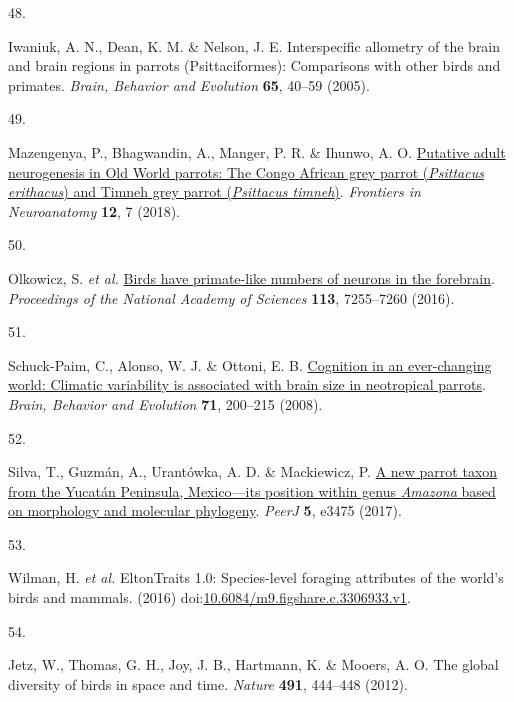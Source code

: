 \documentclass[
  man,floatsintext]{apa6}
\newlength{\cslhangindent}
\newlength{\csllabelwidth}
\newlength{\cslentryspacingunit} %
\newenvironment{CSLReferences}[2] %
 {%
  \setlength{\parindent}{0pt}
  \ifodd #1
  \let\oldpar\par
  \def\par{\hangindent=\cslhangindent\oldpar}
  \fi
  \setlength{\parskip}{#2\cslentryspacingunit}
 }%
 {}
\newcommand{\CSLLeftMargin}[1]{\parbox[t]{\csllabelwidth}{#1}}
\newcommand{\CSLRightInline}[1]{\parbox[t]{\linewidth - \csllabelwidth}{#1}\break}
\begin{document}
\begin{CSLReferences}{0}{0}
\leavevmode{}%
\CSLLeftMargin{48. }%
\CSLRightInline{Iwaniuk, A. N., Dean, K. M. \& Nelson, J. E. Interspecific allometry of the brain and brain regions in parrots ({P}sittaciformes): Comparisons with other birds and primates. \emph{Brain, Behavior and Evolution} \textbf{65}, 40--59 (2005).}

\leavevmode{}%
\CSLLeftMargin{49. }%
\CSLRightInline{Mazengenya, P., Bhagwandin, A., Manger, P. R. \& Ihunwo, A. O. \href{https://doi.org/10.3389/fnana.2018.00007}{Putative adult neurogenesis in {O}ld {W}orld parrots: The {C}ongo {A}frican grey parrot (\emph{{P}sittacus erithacus}) and {T}imneh grey parrot (\emph{{P}sittacus timneh})}. \emph{Frontiers in Neuroanatomy} \textbf{12}, 7 (2018).}

\leavevmode{}%
\CSLLeftMargin{50. }%
\CSLRightInline{Olkowicz, S. \emph{et al.} \href{https://doi.org/10.1073/pnas.1517131113}{Birds have primate-like numbers of neurons in the forebrain}. \emph{Proceedings of the National Academy of Sciences} \textbf{113}, 7255--7260 (2016).}

\leavevmode{}%
\CSLLeftMargin{51. }%
\CSLRightInline{Schuck-Paim, C., Alonso, W. J. \& Ottoni, E. B. \href{https://doi.org/10.1159/000119710}{Cognition in an ever-changing world: Climatic variability is associated with brain size in neotropical parrots}. \emph{Brain, Behavior and Evolution} \textbf{71}, 200--215 (2008).}

\leavevmode{}%
\CSLLeftMargin{52. }%
\CSLRightInline{Silva, T., Guzmán, A., Urantówka, A. D. \& Mackiewicz, P. \href{https://doi.org/10.7717/peerj.3475}{A new parrot taxon from the {Y}ucat{á}n {P}eninsula, {M}exico---its position within genus \emph{{A}mazona} based on morphology and molecular phylogeny}. \emph{PeerJ} \textbf{5}, e3475 (2017).}

\leavevmode{}%
\CSLLeftMargin{53. }%
\CSLRightInline{Wilman, H. \emph{et al.} EltonTraits 1.0: Species-level foraging attributes of the world's birds and mammals. (2016) doi:\href{https://doi.org/10.6084/m9.figshare.c.3306933.v1}{10.6084/m9.figshare.c.3306933.v1}.}

\leavevmode{}%
\CSLLeftMargin{54. }%
\CSLRightInline{Jetz, W., Thomas, G. H., Joy, J. B., Hartmann, K. \& Mooers, A. O. The global diversity of birds in space and time. \emph{Nature} \textbf{491}, 444--448 (2012).}


\end{CSLReferences}
\end{document}
